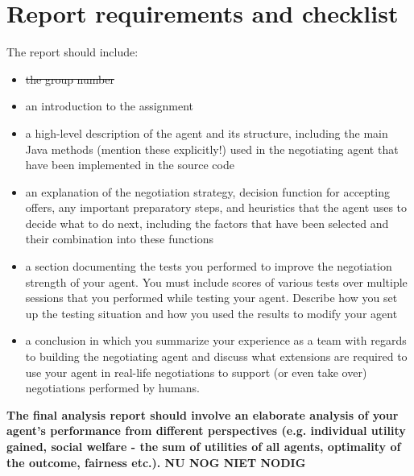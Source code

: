 \documentclass[11pt,a4paper]{report}
\begin{document}
\newpage

\section*{Report requirements and checklist}

The report should include:\\
\begin{itemize}
\item \st{the group number}
\item an introduction to the assignment
\item a high-level description of the agent and its structure, including the main Java methods (mention
these explicitly!) used in the negotiating agent that have been implemented in the source code
\item an explanation of the negotiation strategy, decision function for accepting offers, any important
preparatory steps, and heuristics that the agent uses to decide what to do next, including the factors
that have been selected and their combination into these functions
\item a section documenting the tests you performed to improve the negotiation strength of your agent.
You must include scores of various tests over multiple sessions that you performed while testing
your agent. Describe how you set up the testing situation and how you used the results to modify
your agent
\item a conclusion in which you summarize your experience as a team with regards to building the
negotiating agent and discuss what extensions are required to use your agent in real-life negotiations
to support (or even take over) negotiations performed by humans.
\end{itemize}

\textbf{The final analysis report should involve an elaborate analysis of your agent's performance from different perspectives (e.g. individual utility gained, social welfare - the sum of utilities of all agents, optimality of the outcome, fairness etc.). NU NOG NIET NODIG}
\end{document}
